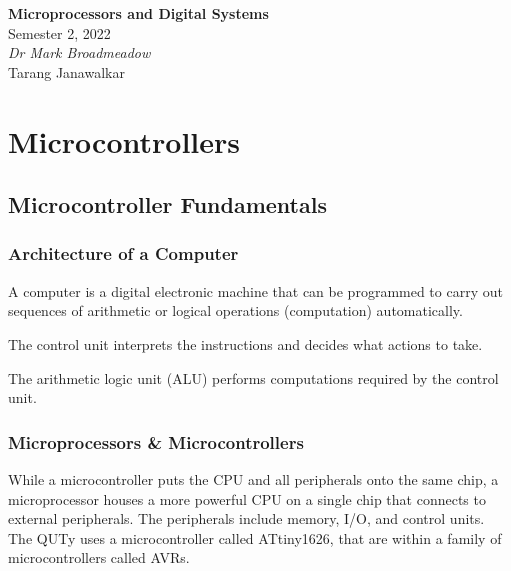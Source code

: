 \documentclass{report}
\date{}
\newcommand{\unitName}{Microprocessors and Digital Systems}
\newcommand{\unitTime}{Semester 2, 2022}
\newcommand{\unitCoordinator}{Dr Mark Broadmeadow}
\newcommand{\documentAuthors}{Tarang Janawalkar}
\begin{document}
%
\begin{titlepage}
    \vspace*{\fill}
    \begin{center}
        \LARGE{\textbf{\unitName}} \\[0.1in]
        \normalsize{\unitTime} \\[0.2in]
        \normalsize\textit{\unitCoordinator} \\[0.2in]
        \documentAuthors
    \end{center}
    \vspace*{\fill}
    \doclicenseThis
    \thispagestyle{empty}
\end{titlepage}
\newpage
%
\tableofcontents
\newpage
%
\part{Microcontrollers}
\chapter{Microcontroller Fundamentals}
\section{Architecture of a Computer}
\begin{definition}[Computer]
    A computer is a digital electronic machine that can be programmed to carry
    out sequences of arithmetic or logical operations (computation) automatically.
\end{definition}
\begin{definition}
    The control unit interprets the instructions and decides what actions to take.
\end{definition}
\begin{definition}
    The arithmetic logic unit (ALU) performs computations required by the control unit.
\end{definition}
\section{Microprocessors \& Microcontrollers}
While a microcontroller puts the CPU and all peripherals onto the same
chip, a microprocessor houses a more powerful CPU on a single chip that
connects to external peripherals. The peripherals include memory, I/O,
and control units. The QUTy uses a microcontroller called ATtiny1626,
that are within a family of microcontrollers called AVRs.
\end{document}
